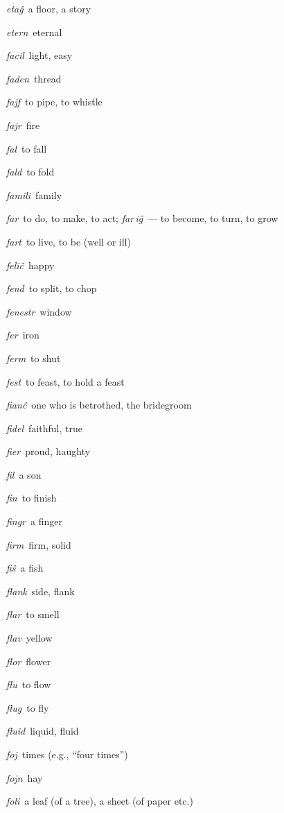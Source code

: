 \begin{landscape}
\begin{multicols}{5}
\begin{outdent}{1em}
\emph{etaĝ\,} a floor, a story

\emph{etern\,} eternal
\end{outdent}


\begin{outdent}{1em}
\emph{facil\,} light, easy

\emph{faden\,} thread

\emph{fajf\,} to pipe, to whistle

\emph{fajr\,} fire

\emph{fal\,} to fall

\emph{fald\,} to fold

\emph{famili\,} family

\emph{far\,} to do, to make, to act; \emph{far\,iĝ\,} — to become, to turn, to grow

\emph{fart\,} to live, to be (well or ill)

\emph{feliĉ\,} happy

\emph{fend\,} to split, to chop

\emph{fenestr\,} window

\emph{fer\,} iron

\emph{ferm\,} to shut

\emph{fest\,} to feast, to hold a feast

\emph{fianĉ\,} one who is betrothed, the bridegroom

\emph{fidel\,} faithful, true

\emph{fier\,} proud, haughty

\emph{fil\,} a son

\emph{fin\,} to finish

\emph{fingr\,} a finger

\emph{firm\,} firm, solid

\emph{fiŝ\,} a fish

\emph{flank\,} side, flank

\emph{flar\,} to smell

\emph{flav\,} yellow

\emph{flor\,} flower

\emph{flu\,} to flow

\emph{flug\,} to fly

\emph{fluid\,} liquid, fluid

\emph{foj\,} times (e.g., ``four times'')

\emph{fojn\,} hay

\emph{foli\,} a leaf (of a tree), a sheet (of paper etc.)


\end{outdent}
\end{multicols}
\end{landscape}
